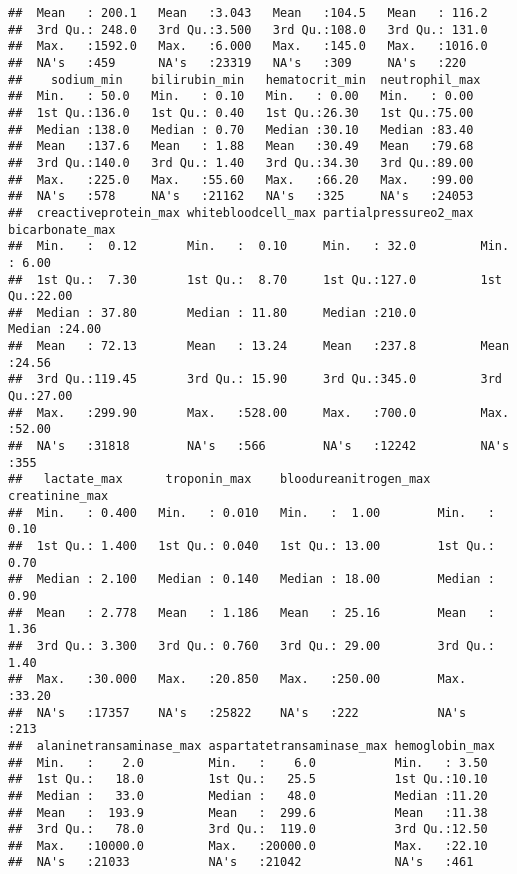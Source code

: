 \documentclass[
]{article}
\begin{document}
\begin{verbatim}
##  Mean   : 200.1   Mean   :3.043   Mean   :104.5   Mean   : 116.2  
##  3rd Qu.: 248.0   3rd Qu.:3.500   3rd Qu.:108.0   3rd Qu.: 131.0  
##  Max.   :1592.0   Max.   :6.000   Max.   :145.0   Max.   :1016.0  
##  NA's   :459      NA's   :23319   NA's   :309     NA's   :220     
##    sodium_min    bilirubin_min   hematocrit_min  neutrophil_max 
##  Min.   : 50.0   Min.   : 0.10   Min.   : 0.00   Min.   : 0.00  
##  1st Qu.:136.0   1st Qu.: 0.40   1st Qu.:26.30   1st Qu.:75.00  
##  Median :138.0   Median : 0.70   Median :30.10   Median :83.40  
##  Mean   :137.6   Mean   : 1.88   Mean   :30.49   Mean   :79.68  
##  3rd Qu.:140.0   3rd Qu.: 1.40   3rd Qu.:34.30   3rd Qu.:89.00  
##  Max.   :225.0   Max.   :55.60   Max.   :66.20   Max.   :99.00  
##  NA's   :578     NA's   :21162   NA's   :325     NA's   :24053  
##  creactiveprotein_max whitebloodcell_max partialpressureo2_max bicarbonate_max
##  Min.   :  0.12       Min.   :  0.10     Min.   : 32.0         Min.   : 6.00  
##  1st Qu.:  7.30       1st Qu.:  8.70     1st Qu.:127.0         1st Qu.:22.00  
##  Median : 37.80       Median : 11.80     Median :210.0         Median :24.00  
##  Mean   : 72.13       Mean   : 13.24     Mean   :237.8         Mean   :24.56  
##  3rd Qu.:119.45       3rd Qu.: 15.90     3rd Qu.:345.0         3rd Qu.:27.00  
##  Max.   :299.90       Max.   :528.00     Max.   :700.0         Max.   :52.00  
##  NA's   :31818        NA's   :566        NA's   :12242         NA's   :355    
##   lactate_max      troponin_max    bloodureanitrogen_max creatinine_max 
##  Min.   : 0.400   Min.   : 0.010   Min.   :  1.00        Min.   : 0.10  
##  1st Qu.: 1.400   1st Qu.: 0.040   1st Qu.: 13.00        1st Qu.: 0.70  
##  Median : 2.100   Median : 0.140   Median : 18.00        Median : 0.90  
##  Mean   : 2.778   Mean   : 1.186   Mean   : 25.16        Mean   : 1.36  
##  3rd Qu.: 3.300   3rd Qu.: 0.760   3rd Qu.: 29.00        3rd Qu.: 1.40  
##  Max.   :30.000   Max.   :20.850   Max.   :250.00        Max.   :33.20  
##  NA's   :17357    NA's   :25822    NA's   :222           NA's   :213    
##  alaninetransaminase_max aspartatetransaminase_max hemoglobin_max 
##  Min.   :    2.0         Min.   :    6.0           Min.   : 3.50  
##  1st Qu.:   18.0         1st Qu.:   25.5           1st Qu.:10.10  
##  Median :   33.0         Median :   48.0           Median :11.20  
##  Mean   :  193.9         Mean   :  299.6           Mean   :11.38  
##  3rd Qu.:   78.0         3rd Qu.:  119.0           3rd Qu.:12.50  
##  Max.   :10000.0         Max.   :20000.0           Max.   :22.10  
##  NA's   :21033           NA's   :21042             NA's   :461    

\end{verbatim}
\end{document}
